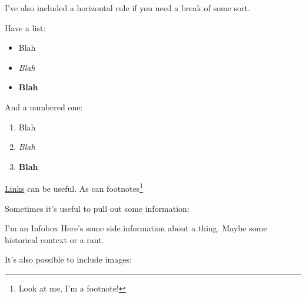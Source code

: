 I've also included a horizontal rule if you need a break of some sort.

\hr

Have a list:

\begin{itemize}
    \item Blah
    \item \textit{Blah}
    \item \textbf{Blah}
\end{itemize}

And a numbered one:

\begin{enumerate}
    \item Blah
    \item \textit{Blah}
    \item \textbf{Blah}
\end{enumerate}

\href{https://duckduckgo.com}{Links} can be useful. As can footnotes\footnote{Look at me, I'm a footnote!}
\\

\pagebreak

Sometimes it's useful to pull out some information:

\begin{infobox}{I'm an Infobox}
    Here's some side information about a thing. Maybe some historical context or a rant.
\end{infobox}


It's also possible to include images:

